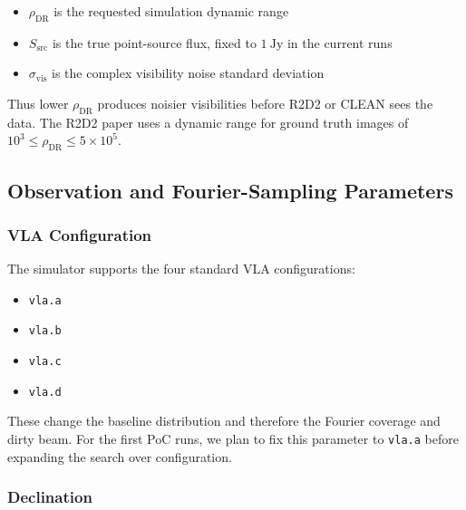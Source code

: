 \documentclass[11pt]{article}
\begin{document}
\begin{itemize}
    \item $\rho_{\text{DR}}$ is the requested simulation dynamic range
    \item $S_{\text{src}}$ is the true point-source flux, fixed to $1~\mathrm{Jy}$ in the current runs
    \item $\sigma_{\text{vis}}$ is the complex visibility noise standard deviation
\end{itemize}

Thus lower $\rho_{\text{DR}}$ produces noisier visibilities before R2D2 or CLEAN sees the data.
The R2D2 paper uses a dynamic range for ground truth images of $10^3\le \rho_\text{DR}\le5\times10^5$.



\subsection{Observation and Fourier-Sampling Parameters}

\subsubsection{VLA Configuration}
\label{sec:param-vla-configuration}

The simulator supports the four standard VLA configurations:
\begin{itemize}
    \item \texttt{vla.a}
    \item \texttt{vla.b}
    \item \texttt{vla.c}
    \item \texttt{vla.d}
\end{itemize}
These change the baseline distribution and therefore the Fourier coverage and dirty beam.
For the first PoC runs, we plan to fix this parameter to \texttt{vla.a} before expanding the search over configuration.

\subsubsection{Declination}
\label{sec:param-declination}
\end{document}
